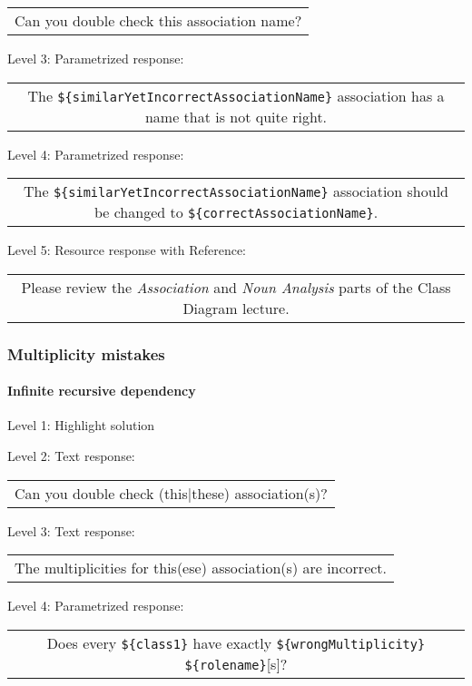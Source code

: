 \begin{tabular}{|c}
Can you double check this association name?
\end{tabular} \medskip

\noindent Level 3: Parametrized response: \medskip

\begin{tabular}{|c}
The \verb|${similarYetIncorrectAssociationName}| association has a name that is not quite right.
\end{tabular} \medskip

\noindent Level 4: Parametrized response: \medskip

\begin{tabular}{|c}
The \verb|${similarYetIncorrectAssociationName}| association should be changed to \verb|${correctAssociationName}|.
\end{tabular} \medskip

\noindent Level 5: Resource response with Reference:

\begin{tabular}{|c}
Please review the \textit{Association} and \textit{Noun Analysis} parts of the Class Diagram lecture.
\end{tabular} \medskip


\subsubsection{Multiplicity mistakes}

\paragraph{Infinite recursive dependency}

\noindent Level 1: Highlight solution \medskip

\noindent Level 2: Text response: \medskip

\begin{tabular}{|c}
Can you double check (this|these) association(s)?
\end{tabular} \medskip

\noindent Level 3: Text response: \medskip

\begin{tabular}{|c}
The multiplicities for this(ese) association(s) are incorrect.
\end{tabular} \medskip

\noindent Level 4: Parametrized response: \medskip

\begin{tabular}{|c}
Does every \verb|${class1}| have exactly \verb|${wrongMultiplicity}| \verb|${rolename}|[s]?
\end{tabular} \medskip

